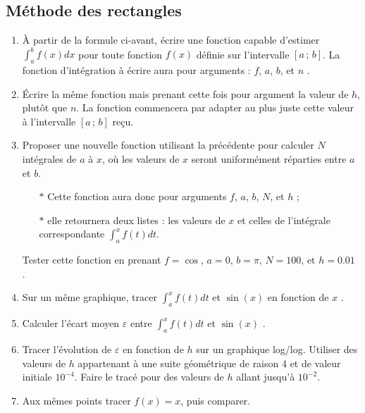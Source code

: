 \subsection{Méthode des rectangles}
\begin{enumerate}
\item À  partir de  la formule ci-avant,  écrire une  fonction capable
  d'estimer $\int_a^b  f(x)dx$ pour toute fonction  $f(x)$ définie sur
  l'intervalle $[a\,;\,b]$.  La fonction  d'intégration
  à   écrire  aura   pour  arguments   :   $f$,  $a$,   $b$,  et   $n$
  .
\item Écrire la même fonction mais prenant cette fois pour argument la
  valeur de  $h$, plutôt que $n$.  La  fonction commencera par  adapter au  plus juste
  cette valeur à l'intervalle $[a\,;\,b]$ reçu.
\item Proposer  une nouvelle  fonction utilisant la précédente
  pour calculer  $N$ intégrales de  $a$ à $x$,  où les valeurs  de $x$
  seront  uniformément  réparties  entre  $a$ et  $b$.
  \begin{itemize}
  \item[$\ast$] Cette fonction aura donc  pour arguments $f$, $a$, $b$,
    $N$, et $h$ ;
  \item[$\ast$] elle retournera deux listes :  les valeurs   de  $x$   et
    celles  de   l'intégrale  correspondante $\int_a^xf(t)dt$.
  \end{itemize}
  Tester cette fonction en prenant $f=\cos$, $a=0$, $b=\pi$, $N=100$, et
  $h=0.01$
  .\\
\item  Sur un même graphique, tracer $\int_a^xf(t)dt$ et $\sin(x)$ en fonction de $x$
  .
\item  Calculer  l'écart  moyen $\varepsilon$ entre  $\int_a^xf(t)dt$  et  $\sin(x)$
  .
\item  Tracer l'évolution  de  $\varepsilon$  en fonction  de  $h$ sur  un
  graphique   log/log. Utiliser  des valeurs  de  $h$  appartenant à  une  suite
  géométrique de  raison 4 et  de valeur initiale $10^{-4}$.  Faire le
  tracé pour des valeurs de $h$ allant jusqu'à $10^{-2}$.
\item Aux   mêmes  points   tracer  $f(x)=x$,   puis  comparer.

  
\end{enumerate}

